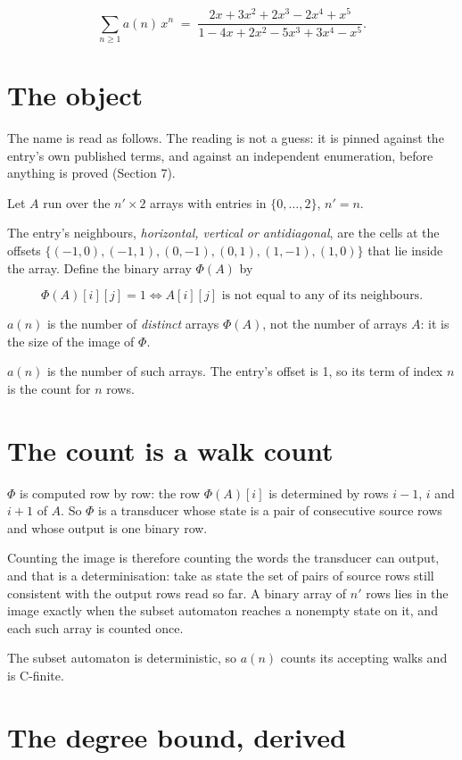 \documentclass[11pt]{article}
\theoremstyle{definition}
\begin{document}
\[\sum_{n \ge 1} a(n)\,x^n \;=\; \frac{2x + 3x^{2} + 2x^{3} - 2x^{4} + x^{5}}{1 - 4x + 2x^{2} - 5x^{3} + 3x^{4} - x^{5}}.\]

\section{The object}

The name is read as follows. The reading is not a guess: it is pinned against the entry's own published terms, and against an independent enumeration, before anything is proved (Section 7).

Let $A$ run over the $n' \times 2$ arrays with entries in $\{0,\dots,2\}$, $n' = n$.

The entry's neighbours, {\itshape horizontal, vertical or antidiagonal}, are the cells at the offsets $\{(-1,0), (-1,1), (0,-1), (0,1), (1,-1), (1,0)\}$ that lie inside the array. Define the binary array $\Phi(A)$ by

\[\Phi(A)[i][j] = 1 \iff A[i][j] \text{ is not equal to any of its neighbours}.\]

$a(n)$ is the number of {\itshape distinct} arrays $\Phi(A)$, not the number of arrays $A$: it is the size of the image of $\Phi$.

$a(n)$ is the number of such arrays. The entry's offset is 1, so its term of index $n$ is the count for $n$ rows.

\section{The count is a walk count}

$\Phi$ is computed row by row: the row $\Phi(A)[i]$ is determined by rows $i-1$, $i$ and $i+1$ of $A$. So $\Phi$ is a transducer whose state is a pair of consecutive source rows and whose output is one binary row.

Counting the image is therefore counting the words the transducer can output, and that is a determinisation: take as state the set of pairs of source rows still consistent with the output rows read so far. A binary array of $n'$ rows lies in the image exactly when the subset automaton reaches a nonempty state on it, and each such array is counted once.

The subset automaton is deterministic, so $a(n)$ counts its accepting walks and is C-finite.

\section{The degree bound, derived}
\end{document}
